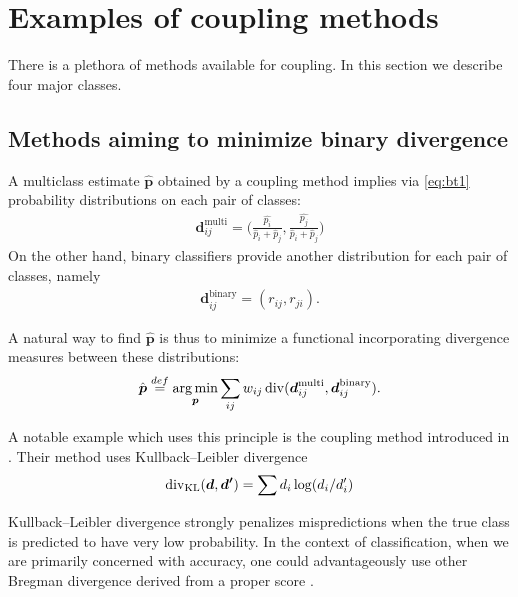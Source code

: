 

\section{Examples of coupling methods} \label{sec:coupling}

There is a plethora of methods available for coupling. In this section we describe four major classes.

\subsection{Methods aiming to minimize binary divergence}

A multiclass estimate $\hat{\boldsymbol{p}}$ obtained by a coupling method implies via \eqref{eq:bt1} probability distributions on each pair of classes:
\begin{align*}
	\boldsymbol{d}_{ij}^\textrm{multi}= \biggl(\frac{\hat{p_i}}{\hat p_i + \hat p_j},\frac{\hat{p_j}}{\hat p_i + \hat p_j}\biggr)	
\end{align*}
On the other hand, binary classifiers provide another distribution for each pair of  classes, namely
\begin{align*}
\boldsymbol{d}_{ij}^\textrm{binary} = ( r_{ij},  r_{ji}).
\end{align*}

A natural way to find  $\hat{\boldsymbol{p}}$ is thus to minimize a functional incorporating divergence measures between these distributions:
\begin{align*}
\hat{\boldsymbol{p}} \stackrel{def}{=} \operatorname*{arg\,min}_{\boldsymbol{p}} \sum_{ij} w_{ij} \operatorname*{div} (\boldsymbol{d}_{ij}^\textrm{multi}, \boldsymbol{d}_{ij}^\textrm{binary}).
\end{align*}

A notable example which uses this principle is the coupling method introduced in \cite{hastie1998classification}. Their method uses Kullback--Leibler divergence 
\begin{align*}
	\operatorname*{div}\nolimits_\textrm{KL} (\boldsymbol{d}, \boldsymbol{d'})= \sum d_i \log (d_i/ d'_i)
\end{align*}

Kullback--Leibler divergence strongly penalizes  mispredictions when the true class is predicted to have very low probability. In the context of classification, when we are primarily concerned with accuracy, one could advantageously use other Bregman divergence derived from a proper score \cite{gneiting2007strictly, buja2005loss}.
 
